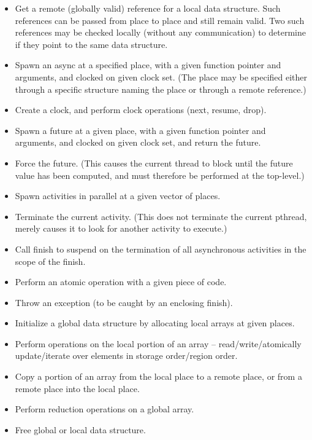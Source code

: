 \begin{itemize}
	\item Get a remote (globally valid) reference for a local data structure.
		Such references can be passed from place to place and still remain
		valid. Two such references may be checked locally (without any
		communication) to determine if they point to the same data
		structure.

	\item Spawn an async at a specified place, with a given function pointer
		and arguments, and clocked on given clock set. (The place may be
		specified either through a specific structure naming the place or
		through a remote reference.)

	\item Create a clock, and perform clock operations (next, resume, drop).

	\item Spawn a future at a given place, with a given function
		pointer and arguments, and clocked on given clock set, and return
		the future.

	\item Force the future. (This causes the current thread to block until the
		future value has been computed, and must therefore be performed at
		the top-level.)

	\item Spawn activities in parallel at a given vector of places.

	\item Terminate the current activity. (This does not terminate the current
		pthread, merely causes it to look for another activity to execute.)

	\item Call finish to suspend on the termination of all asynchronous
		activities in the scope of the finish.

	\item Perform an atomic operation with a given piece of code.
	\item Throw an exception (to be caught by an enclosing finish).

	\item Initialize a global data structure by allocating local arrays at
		given places.

	\item Perform operations on the local portion of an array --
		read/write/atomically update/iterate over elements in storage
		order/region order.

	\item Copy a portion of an array from the local place to a remote
		place, or from a remote place into the local place.

	\item Perform reduction operations on a global array.

	\item Free global or local data structure.
\end{itemize}


